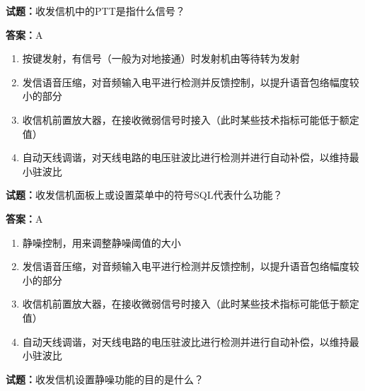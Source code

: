 \documentclass{ctexbook}
\begin{document}
\vspace{1em}

\textbf{试题：}收发信机中的PTT是指什么信号？ 

\textbf{答案：}A 

\begin{enumerate}[leftmargin=3em]
  \item 按键发射，有信号（一般为对地接通）时发射机由等待转为发射 

  \item 发信语音压缩，对音频输入电平进行检测并反馈控制，以提升语音包络幅度较小的部分 

  \item 收信机前置放大器，在接收微弱信号时接入（此时某些技术指标可能低于额定值） 

  \item 自动天线调谐，对天线电路的电压驻波比进行检测并进行自动补偿，以维持最小驻波比 

\end{enumerate}





\vspace{1em}

\textbf{试题：}收发信机面板上或设置菜单中的符号SQL代表什么功能？ 

\textbf{答案：}A 

\begin{enumerate}[leftmargin=3em]
  \item 静噪控制，用来调整静噪阈值的大小 

  \item 发信语音压缩，对音频输入电平进行检测并反馈控制，以提升语音包络幅度较小的部分 

  \item 收信机前置放大器，在接收微弱信号时接入（此时某些技术指标可能低于额定值） 

  \item 自动天线调谐，对天线电路的电压驻波比进行检测并进行自动补偿，以维持最小驻波比 

\end{enumerate}





\vspace{1em}

\textbf{试题：}收发信机设置静噪功能的目的是什么？ 
\end{document}
